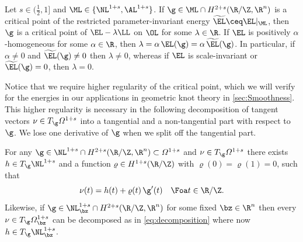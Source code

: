 \begin{theorem}
\label{thm:critical-points}
Let $s\in (\frac{1}{2},1]$ and $ \ML\in \{\NL^{1+s},\AL^{1+s}\} $.
If $\g\in\ML\cap H^{2+s}(\R/\Z,\R^n)$ is a critical point of the restricted
parameter-invariant energy $\widetilde{\EL}\ceq\EL|_{\ML}$, 
then $\g$ is a critical
point of $\EL-\lambda\LL$ on $\OL$ for some $\lambda\in\R$. If  
$\EL$ is 
positively $\alpha$-homogeneous for some 
$\alpha\in\R$, then
$\lambda = \alpha \, \EL(\g) = \alpha \, \widetilde{\EL}(\g)$. In particular, if $\alpha\not=0$ and
$\widetilde{\EL}(\g)\not= 0$ then $\lambda\not= 0$, whereas
if $\EL$ is scale-invariant or $\widetilde{\EL}(\g)=0$, then $\lambda=0$.
\end{theorem}

Notice that we require higher regularity of the critical point, 
which we will verify for the energies in
our applications in geometric knot theory in \cref{sec:Smoothness}. 
This higher regularity  is necessary in
the following decomposition of tangent vectors $\nu\in T_\g\varOmega^{1+s}$
into a tangential and a non-tangential part  with respect to $\g$. 
We lose one derivative of $\g$ when we split off the tangential part.
\begin{lemma}
\label{lem:decomposition}
For any $\g\in \NL^{1+s}\cap H^{2+s}(\R/\Z,\R^n)\subset\varOmega^{1+s}$ 
and $\nu\in T_\g\varOmega^{1+s}$ there exists
$h\in T_\g\NL^{1+s}$ and a function $\varrho\in H^{1+s}(\R/\Z)$ with $\varrho(0)=\varrho(1)=0$, such 
that 
\begin{equation}\label{eq:decomposition}
	\nu(t)=h(t) + \varrho(t) \, \g'(t)\quad\Foa t\in\R/\Z.
\end{equation}
Likewise, if $\g\in\NL^{1+s}_{\bz}\cap H^{2+s}(\R/\Z,\R^n)$ for some fixed $\bz\in\R^n$
then every $\nu\in T_\g\varOmega^{1+s}_\bz$ can be decomposed as in \cref{eq:decomposition}
where now $h\in T_\g\NL^{1+s}_\bz$.
\end{lemma}
